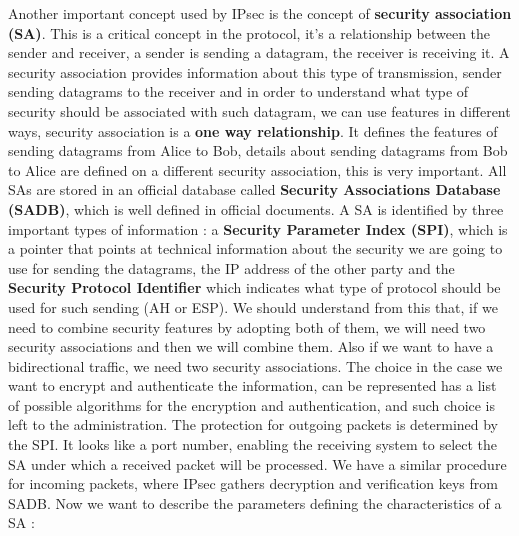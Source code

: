 \documentclass[11pt]{article}
\begin{document}
Another important concept used by IPsec is the concept of \textbf{security association (SA)}. This is a critical concept in the protocol, it's a relationship between the sender and receiver, a sender is sending a datagram, the receiver is receiving it. A security association provides information about this type of transmission, sender sending datagrams to the receiver and in order to understand what type of security should be associated with such datagram, we can use features in different ways, security association is a \textbf{one way relationship}. It defines the features of sending datagrams from Alice to Bob, details about sending datagrams from Bob to Alice are defined on a different security association, this is very important. All SAs are stored in an official database called \textbf{Security Associations Database (SADB)}, which is well defined in official documents. A SA is identified by three important types of information : a \textbf{Security Parameter Index (SPI)}, which is a pointer that points at technical information about the security we are going to use for sending the datagrams, the IP address of the other party and the \textbf{Security Protocol Identifier} which indicates what type of protocol should be used for such sending (AH or ESP). We should understand from this that, if we need to combine security features by adopting both of them, we will need two security associations and then we will combine them. Also if we want to have a bidirectional traffic, we need two security associations. The choice in the case we want to encrypt and authenticate the information, can be represented has a list of possible algorithms for the encryption and authentication, and such choice is left to the administration. The protection for outgoing packets is determined by the SPI. It looks like a port number, enabling the receiving system to select the SA under which a received packet will be processed. We have a similar procedure for incoming packets, where IPsec gathers decryption and verification keys from SADB. Now we want to describe the parameters defining the characteristics of a SA :
\end{document}
